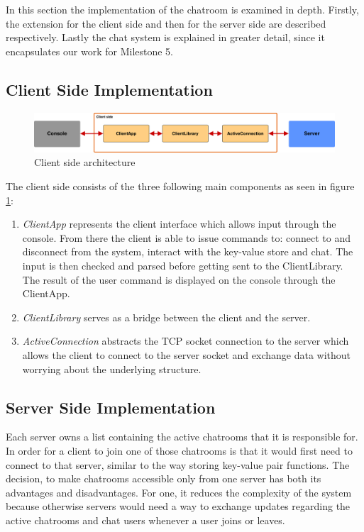 In this section the implementation of the chatroom is examined in depth. Firstly, the extension for the client side and then for the server side are described respectively. Lastly the chat system is explained in greater detail, since it encapsulates our work for Milestone 5.

\subsection{Client Side Implementation}
\label{sec:Implementation_clintside}

\begin{figure}[h]
	\centering
	\includegraphics[width=\linewidth]{figures/kvserver/client_arch.png}
	\caption{Client side architecture}
	\label{fig:client_arch}
\end{figure}
The client side consists of the three following main components as seen in figure \ref{fig:client_arch}:
\begin{enumerate} 
  \item \textit{ClientApp} represents the client interface which allows input through the console. From there the client is able to issue commands to: connect to and disconnect from the system, interact with the key-value store and chat. The input is then checked and parsed before getting sent to the ClientLibrary. The result of the user command is displayed on the console through the ClientApp.
  \item \textit{ClientLibrary} serves as a bridge between the client and the server.
  \item \textit{ActiveConnection} abstracts the TCP socket connection to the server which allows the client to connect to the server socket and exchange data without worrying about the underlying structure.
\end{enumerate}
 
\subsection{Server Side Implementation}
\label{sec:implementation_serverside}

Each server owns a list containing the active chatrooms that it is responsible for. In order for a client to join one of those chatrooms is that it would first need to connect to that server, similar to the way storing key-value pair functions. The decision, to make chatrooms accessible only from one server has both its advantages and disadvantages. For one, it reduces the complexity of the system because otherwise servers would need a way to exchange updates regarding the active chatrooms and chat users whenever a user joins or leaves.

